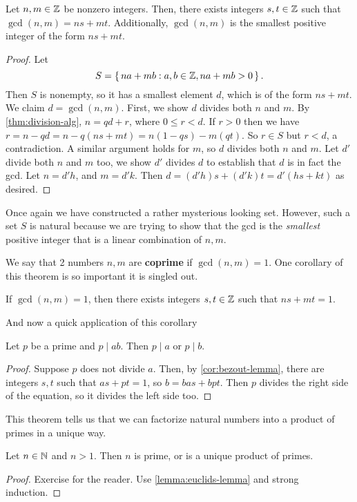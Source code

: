 \documentclass[./algebra-notes.tex]{subfiles}
\begin{document}
\begin{theorem}
\label{thm:gcd-is-linear-combination}
    Let $n, m \in \mathbb{Z}$ be nonzero integers. Then, there exists integers $s, t
    \in \mathbb{Z}$ such that $\gcd(n, m) = ns + mt$. Additionally, $\gcd(n,m)$ is the
    smallest positive integer of the form $ns + mt$.
\end{theorem}
\begin{proof}
    Let 
    \[
    S = \set{na + mb : a, b \in \mathbb{Z}, na + mb > 0}.
    \]
    Then $S$ is nonempty, so it has a smallest element $d$, which is of the form
    $ns + mt$. We claim $d = \gcd(n, m)$. First, we show $d$ divides both $n$
    and $m$. By \cref{thm:division-alg}, $n = qd + r$, where $0 \leq r < d$. If
    $r > 0$ then we have $r = n - qd = n - q(ns+mt) = n(1-qs) - m(qt)$. So $r
    \in S$ but $r < d$, a contradiction. A similar argument holds for $m$, so
    $d$ divides both $n$ and $m$. Let $d'$ divide both $n$ and $m$ too, we show
    $d'$ divides $d$ to establish that $d$ is in fact the gcd. Let $n = d'h$,
    and $m = d'k$. Then $d = (d'h)s + (d'k)t = d'(hs + kt)$ as desired.
\end{proof}
Once again we have constructed a rather mysterious looking set. However, such a
set $S$ is natural because we are trying to show that the gcd is the
\emph{smallest} positive integer that is a linear combination of $n, m$. 

We say that 2 numbers $n, m$ are \textbf{coprime} if $\gcd(n, m) = 1$. One
corollary of this theorem is so important it is singled out. 
\begin{corollary}
\label{cor:bezout-lemma}
    If $\gcd(n, m) = 1$, then there exists integers $s, t \in \mathbb{Z}$ such that $ns + mt = 1$. 
\end{corollary}

And now a quick application of this corollary

\begin{lemma}
\label{lemma:euclids-lemma}
    Let $p$ be a prime and $p \mid ab$. Then $p \mid a$ or $p \mid b$.
\end{lemma}
\begin{proof}
    Suppose $p$ does not divide $a$. Then, by \cref{cor:bezout-lemma}, there are
    integers $s,t$ such that $as+pt = 1$, so $b = bas + bpt$. Then $p$ divides
    the right side of the equation, so it divides the left side too.
\end{proof}

This theorem tells us that we can factorize natural numbers into a product of
primes in a unique way.
\begin{theorem}
\label{thm:fundamental-theorem-of-arthmetic}
    Let $n \in \mathbb{N}$ and $n > 1$. Then $n$ is prime, or is a unique product of
    primes. 
\end{theorem}
\begin{proof}
    Exercise for the reader. Use \cref{lemma:euclids-lemma} and strong induction. 
\end{proof}
\end{document}

